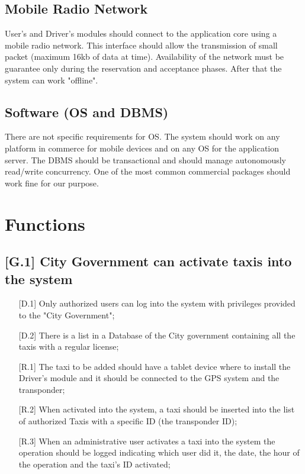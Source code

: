 \documentclass[12pt,a4paper]{book}
\begin{document}
			\subsection{Mobile Radio Network}
			User's and Driver's modules should connect to the application core using a mobile radio network. This interface should allow the transmission of small packet (maximum 16kb of data at time).
			Availability of the network must be guarantee only during the reservation and acceptance phases. After that the system can work "offline".
			\subsection{Software (OS and DBMS)}
			There are not specific requirements for OS. The system should work on any platform in commerce for mobile devices and on any OS for the application server.
			The DBMS should be transactional and should manage autonomously read/write concurrency. One of the most common commercial packages should work fine for our purpose.
		\section{Functions}
			\subsection{[G.1] City Government can activate taxis into the system}
			\begin{itemize}
				\item[\textbullet] [D.1] Only authorized users can log into the system with privileges provided to the "City Government";
				\item[\textbullet] [D.2] There is a list in a Database of the City government containing all the taxis with a regular license;
				\item[\textbullet] [R.1] The taxi to be added should have a tablet device where to install the Driver's module and it should be connected to the GPS system and the transponder;
				\item[\textbullet] [R.2] When activated into the system, a taxi should be inserted into the list of authorized Taxis with a specific ID (the transponder ID);
				\item[\textbullet] [R.3] When an administrative user activates a taxi into the system the operation should be logged indicating which user did it, the date, the hour of the operation and the taxi's ID activated;
			\end{itemize}
\end{document}
